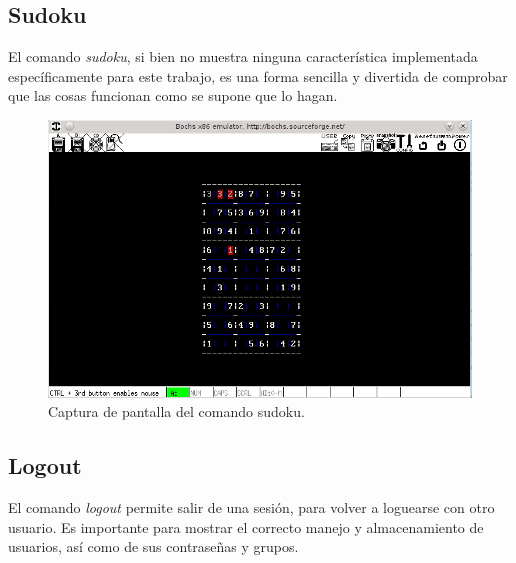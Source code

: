\documentclass[a4paper,10pt]{article}
\begin{document}
      \subsection{Sudoku}
      El comando \textit{sudoku}, si bien no muestra ninguna característica implementada específicamente para este trabajo, es una forma sencilla y divertida
      de comprobar que las cosas funcionan como se supone que lo hagan.

     \begin{figure}[H]
      \begin{center}
      \includegraphics[scale=0.65]{./images/sudoku.png}
	 \caption{Captura de pantalla del comando sudoku.}
      \end{center}
      \end{figure}

      \subsection{Logout}
      El comando \textit{logout} permite salir de una sesión, para volver a loguearse con otro usuario. Es importante para mostrar el correcto manejo y 
      almacenamiento de usuarios, así como de sus contraseñas y grupos.
    
\end{document}
